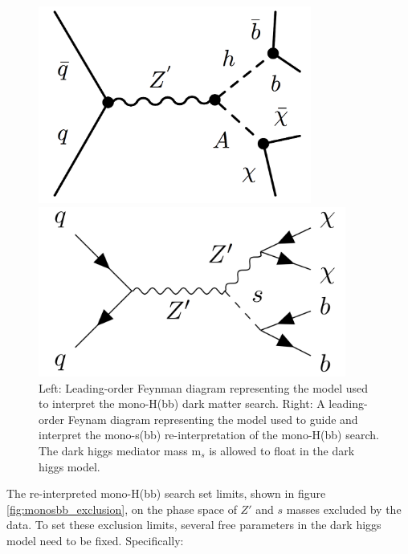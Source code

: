 \documentclass[12pt]{article}
\begin{document}
\begin{figure}[H]
	\centering
	\begin{minipage}[b]{0.45\textwidth}
	\includegraphics[width=0.8\textwidth]{figures/monohbb}
	\end{minipage}
	\begin{minipage}[b]{0.45\textwidth}
	\includegraphics[width=0.9\textwidth]{figures/monosbb}
	\end{minipage}
	\caption[]{Left: Leading-order Feynman diagram representing the model used to interpret the mono-H(bb) dark matter search. Right: A leading-order Feynam diagram representing the model used to guide and interpret the mono-s(bb) re-interpretation of the mono-H(bb) search. The dark higgs mediator mass m$_s$ is allowed to float in the dark higgs model.}
	\label{fig:monohbbreinterp}
\end{figure}

The re-interpreted mono-H(bb) search set limits, shown in figure \ref{fig:monosbb_exclusion}, on the phase space of $Z'$ and $s$ masses excluded by the data. To set these exclusion limits, several free parameters in the dark higgs model need to be fixed. Specifically:
\end{document}

